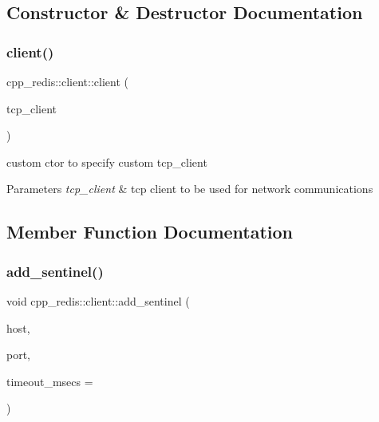 \subsection{Constructor \& Destructor Documentation}
\mbox{\label{classcpp__redis_1_1client_ae879c3a6829a2da9d03f80c1ec4b8d9b}} 
\subsubsection{\texorpdfstring{client()}{client()}}
{\footnotesize\ttfamily cpp\+\_\+redis\+::client\+::client (\begin{DoxyParamCaption}\item[{const std\+::shared\+\_\+ptr$<$ \mbox{\hyperlink{classcpp__redis_1_1network_1_1tcp__client__iface}{network\+::tcp\+\_\+client\+\_\+iface}} $>$ \&}]{tcp\+\_\+client }\end{DoxyParamCaption})\hspace{0.3cm}{\ttfamily [explicit]}}

custom ctor to specify custom tcp\+\_\+client


\begin{DoxyParams}{Parameters}
{\em tcp\+\_\+client} & tcp client to be used for network communications \\
\hline
\end{DoxyParams}


\subsection{Member Function Documentation}
\mbox{\label{classcpp__redis_1_1client_abd52019ee708559179c501892e6448dc}} 
\subsubsection{\texorpdfstring{add\+\_\+sentinel()}{add\_sentinel()}}
{\footnotesize\ttfamily void cpp\+\_\+redis\+::client\+::add\+\_\+sentinel (\begin{DoxyParamCaption}\item[{const std\+::string \&}]{host,  }\item[{std\+::size\+\_\+t}]{port,  }\item[{std\+::uint32\+\_\+t}]{timeout\+\_\+msecs = {} }\end{DoxyParamCaption})}

